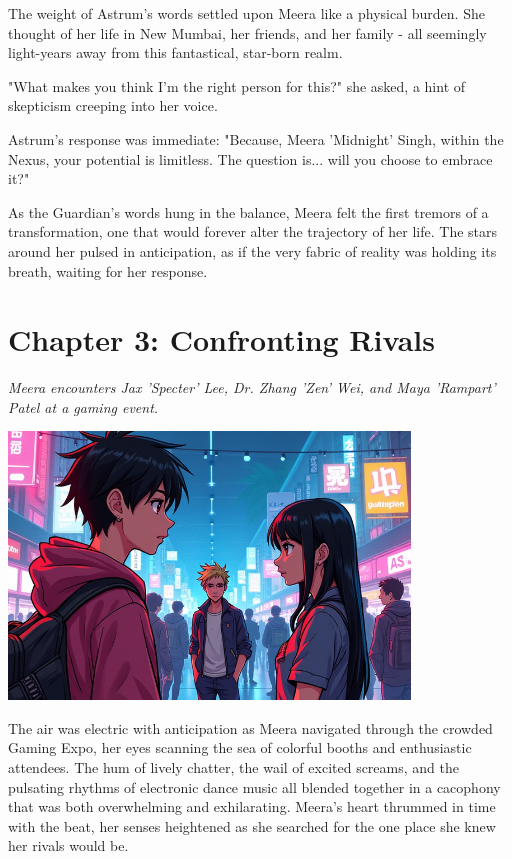 \documentclass[12pt]{book}
\begin{document}
The weight of Astrum's words settled upon Meera like a physical burden.
She thought of her life in New Mumbai, her friends, and her family - all
seemingly light-years away from this fantastical, star-born realm.

"What makes you think I'm the right person for this?" she asked, a hint
of skepticism creeping into her voice.

Astrum's response was immediate: "Because, Meera 'Midnight' Singh,
within the Nexus, your potential is limitless. The question is... will
you choose to embrace it?"

As the Guardian's words hung in the balance, Meera felt the first
tremors of a transformation, one that would forever alter the trajectory
of her life. The stars around her pulsed in anticipation, as if the very
fabric of reality was holding its breath, waiting for her response.


\newpage

\chapter*{Chapter 3: Confronting Rivals}
\textit{Meera encounters Jax 'Specter' Lee, Dr. Zhang 'Zen' Wei, and Maya 'Rampart' Patel at a gaming event.}

\begin{center}
\includegraphics[width=0.8\textwidth]{stories/my_story/step_6/scenes/rival_encounter.live.png}
\end{center}

The air was electric with anticipation as Meera navigated through the
crowded Gaming Expo, her eyes scanning the sea of colorful booths and
enthusiastic attendees. The hum of lively chatter, the wail of excited
screams, and the pulsating rhythms of electronic dance music all blended
together in a cacophony that was both overwhelming and exhilarating.
Meera's heart thrummed in time with the beat, her senses heightened as
she searched for the one place she knew her rivals would be.
\end{document}
